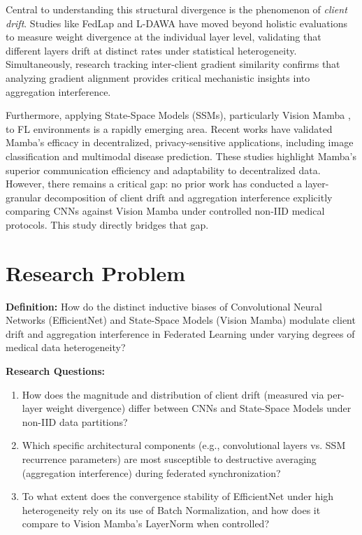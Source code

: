 \documentclass[conference]{IEEEtran}
\begin{document}
Central to understanding this structural divergence is the phenomenon of \textit{client drift}. Studies like FedLap \cite{b3} and L-DAWA \cite{b4} have moved beyond holistic evaluations to measure weight divergence at the individual layer level, validating that different layers drift at distinct rates under statistical heterogeneity. Simultaneously, research tracking inter-client gradient similarity \cite{b5} confirms that analyzing gradient alignment provides critical mechanistic insights into aggregation interference.

Furthermore, applying State-Space Models (SSMs), particularly Vision Mamba \cite{b6}, to FL environments is a rapidly emerging area. Recent works have validated Mamba's efficacy in decentralized, privacy-sensitive applications, including image classification \cite{b7} and multimodal disease prediction. These studies highlight Mamba's superior communication efficiency and adaptability to decentralized data. However, there remains a critical gap: no prior work has conducted a layer-granular decomposition of client drift and aggregation interference explicitly comparing CNNs against Vision Mamba under controlled non-IID medical protocols. This study directly bridges that gap.

\section{Research Problem}
\textbf{Definition:} How do the distinct inductive biases of Convolutional Neural Networks (EfficientNet) and State-Space Models (Vision Mamba) modulate client drift and aggregation interference in Federated Learning under varying degrees of medical data heterogeneity?

\textbf{Research Questions:}
\begin{enumerate}
    \item How does the magnitude and distribution of client drift (measured via per-layer weight divergence) differ between CNNs and State-Space Models under non-IID data partitions?
    \item Which specific architectural components (e.g., convolutional layers vs. SSM recurrence parameters) are most susceptible to destructive averaging (aggregation interference) during federated synchronization?
    \item To what extent does the convergence stability of EfficientNet under high heterogeneity rely on its use of Batch Normalization, and how does it compare to Vision Mamba's LayerNorm when controlled?
\end{enumerate}
\end{document}
